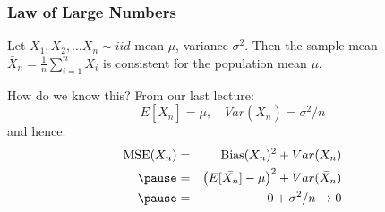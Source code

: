 \begin{frame}
  \frametitle{Law of Large Numbers}

Let $X_1, X_2, \hdots X_n \sim iid$ mean $\mu$, variance $\sigma^2$. Then the sample mean $\bar{X}_n = \frac{1}{n}\sum_{i=1}^n X_i$
is consistent for the population mean $\mu$.

\pause

\vspace{1em}

\begin{block}{How do we know this?}
From our last lecture:
\[
  E[\bar{X}_n] = \mu, \quad Var(\bar{X}_n) = \sigma^2/n
  \]
and hence:
\begin{eqnarray*}
			\mbox{MSE}(\bar{X}_n) &=& \mbox{Bias}(\bar{X}_n)^2 + Var(\bar{X}_n)\\\pause
				&=& \left(E[\bar{X_n}] - \mu\right)^2 + Var(\bar{X}_n)\\ \pause
				&=& 0 + \sigma^2/n \rightarrow 0  
	\end{eqnarray*}
\end{block}

\end{frame}

